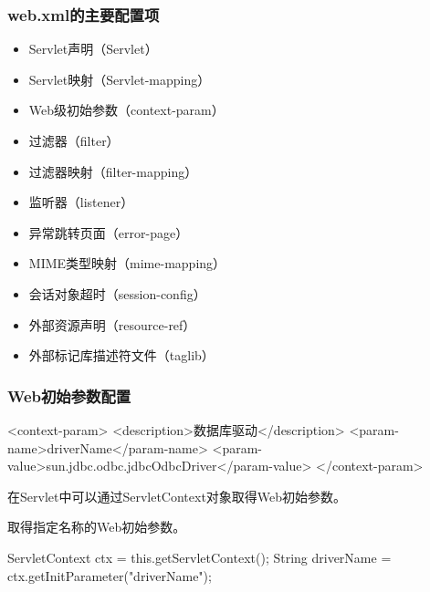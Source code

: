 \begin{frame}[fragile] %
  \frametitle{web.xml的主要配置项} 

  \begin{itemize}
  \item Servlet声明（Servlet）
  \item Servlet映射（Servlet-mapping）    
  \item Web级初始参数（context-param）
  \item 过滤器（filter）
  \item 过滤器映射（filter-mapping）
  \item 监听器（listener）
  \item 异常跳转页面（error-page）
  \item MIME类型映射（mime-mapping）
  \item 会话对象超时（session-config）
  \item 外部资源声明（resource-ref）
  \item 外部标记库描述符文件（taglib）
  \end{itemize}
\end{frame}

\begin{frame}[fragile] %
  \frametitle{Web初始参数配置} 


  \begin{xmlCode}
    <context-param>
    <description>数据库驱动</description>
    <param-name>driverName</param-name>
    <param-value>sun.jdbc.odbc.jdbcOdbcDriver</param-value>
    </context-param>
  \end{xmlCode}


  在Servlet中可以通过ServletContext对象取得Web初始参数。

   取得指定名称的Web初始参数。

  \begin{javaCode}
    ServletContext ctx = this.getServletContext();
    String driverName = ctx.getInitParameter("driverName");  
  \end{javaCode}
\end{frame}

